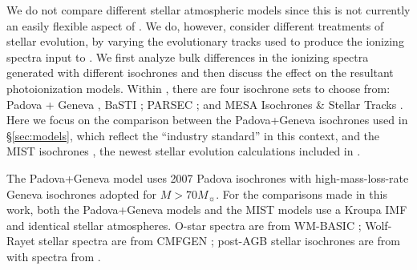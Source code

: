 We do not compare different stellar atmospheric models since this is not currently an easily flexible aspect of \FSPS. We do, however, consider different treatments of stellar evolution, by varying the evolutionary tracks used to produce the ionizing spectra input to \Cloudy. We first analyze bulk differences in the ionizing spectra generated with different isochrones and then discuss the effect on the resultant photoionization models. Within \FSPS, there are four isochrone sets to choose from: Padova \citep{Bertelli94, Girardi00, Marigo08} + Geneva \citep{Schaller92, Meynet00}, BaSTI \citep{Pietrinferni, Cordier07}; PARSEC \citep{Bressan12}; and MESA Isochrones \& Stellar Tracks \citep[MIST,][]{Dotter16, Choi16}. Here we focus on the comparison between the Padova+Geneva isochrones used in \S\ref{sec:models}, which reflect the ``industry standard'' in this context, and the MIST isochrones \citep[MIST,][]{Dotter16, Choi16}, the newest stellar evolution calculations included in \FSPS.

The Padova+Geneva model uses 2007 Padova isochrones with high-mass-loss-rate Geneva isochrones adopted for $M > 70 M_{\sun}$. For the comparisons made in this work, both the Padova+Geneva models and the MIST models use a Kroupa IMF and identical stellar atmospheres. O-star spectra are from WM-BASIC \citep[][updates from Eldridge et al., \emph{in prep}]{Pauldrach01}; Wolf-Rayet stellar spectra are from CMFGEN \citep{HillierMiller}; post-AGB stellar isochrones are from \citep{Vassiliadis} with spectra from \citep{Rauch03}.

